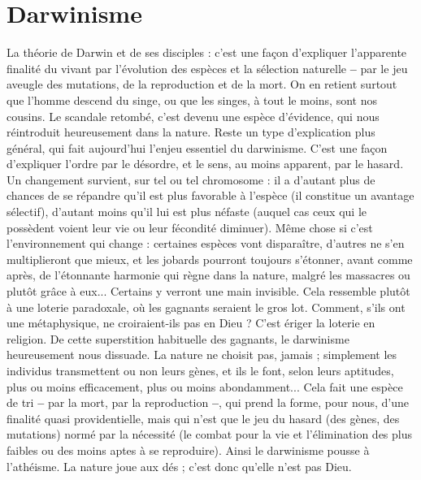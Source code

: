 \section{Darwinisme}
La théorie de Darwin et de ses disciples : c’est une façon
d’expliquer l’apparente finalité du vivant par l’évolution des
espèces et la sélection naturelle {\bf --} par le jeu aveugle des mutations, de la reproduction
et de la mort. On en retient surtout que l’homme descend du singe, ou
que les singes, à tout le moins, sont nos cousins. Le scandale retombé, c’est
devenu une espèce d’évidence, qui nous réintroduit heureusement dans la
nature. Reste un type d’explication plus général, qui fait aujourd’hui l’enjeu
essentiel du darwinisme. C’est une façon d’expliquer l’ordre par le désordre, et
le sens, au moins apparent, par le hasard. Un changement survient, sur tel ou
tel chromosome : il a d’autant plus de chances de se répandre qu’il est plus
favorable à l’espèce (il constitue un avantage sélectif), d'autant moins qu’il lui
est plus néfaste (auquel cas ceux qui le possèdent voient leur vie ou leur fécondité
diminuer). Même chose si c’est l’environnement qui change : certaines
espèces vont disparaître, d’autres ne s’en multiplieront que mieux, et les jobards
pourront toujours s'étonner, avant comme après, de l’étonnante harmonie qui
règne dans la nature, malgré les massacres ou plutôt grâce à eux... Certains y
verront une main invisible. Cela ressemble plutôt à une loterie paradoxale, où
les gagnants seraient le gros lot. Comment, s’ils ont une métaphysique, ne croiraient-ils
pas en Dieu ? C’est ériger la loterie en religion. De cette superstition
habituelle des gagnants, le darwinisme heureusement nous dissuade. La nature
ne choisit pas, jamais ; simplement les individus transmettent ou non leurs
gènes, et ils le font, selon leurs aptitudes, plus ou moins efficacement, plus ou
moins abondamment... Cela fait une espèce de tri {\bf --} par la mort, par la reproduction {\bf --},
qui prend la forme, pour nous, d’une finalité quasi providentielle,
mais qui n’est que le jeu du hasard (des gènes, des mutations) normé par la
nécessité (le combat pour la vie et l'élimination des plus faibles ou des moins
aptes à se reproduire). Ainsi le darwinisme pousse à l’athéisme. La nature joue
aux dés ; c’est donc qu’elle n’est pas Dieu.

